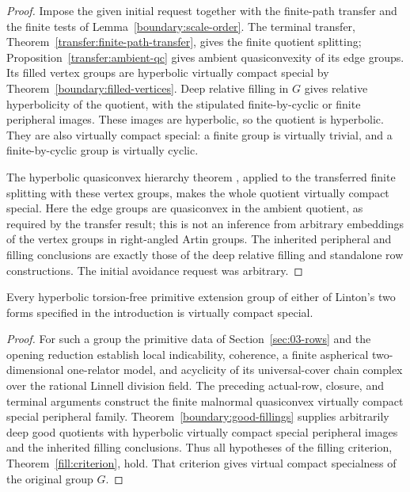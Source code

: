 \begin{proof}
Impose the given initial request together with the finite-path transfer
and the finite tests of Lemma~\ref{boundary:scale-order}. The terminal
transfer, Theorem~\ref{transfer:finite-path-transfer}, gives the finite
quotient splitting; Proposition~\ref{transfer:ambient-qc} gives ambient quasiconvexity
of its edge groups. Its filled vertex groups are hyperbolic virtually compact
special by Theorem~\ref{boundary:filled-vertices}. Deep relative filling
in $G$ gives relative hyperbolicity of the quotient, with the stipulated
finite-by-cyclic or finite peripheral images. These images are hyperbolic,
so the quotient is hyperbolic. They are also virtually compact special:
a finite group is virtually trivial, and a finite-by-cyclic group is
virtually cyclic.

The hyperbolic quasiconvex hierarchy theorem \cite{Wise2021}, applied to
the transferred finite splitting with these vertex groups, makes the
whole quotient virtually compact special. Here the edge groups are
quasiconvex in the ambient quotient, as required by the transfer result;
this is not an inference from arbitrary embeddings of the vertex groups
in right-angled Artin groups. The inherited peripheral and filling
conclusions are exactly those of the deep relative filling and standalone
row constructions. The initial avoidance request was arbitrary.
\end{proof}

\begin{theorem}\label{boundary:primitive-vcs}
Every hyperbolic torsion-free primitive extension group of either of
Linton's two forms specified in the introduction is virtually compact
special.
\end{theorem}

\begin{proof}
For such a group the primitive data of Section~\ref{sec:03-rows} and the
opening reduction establish local indicability,
coherence, a finite aspherical two-dimensional one-relator model, and
acyclicity of its universal-cover chain complex over the rational Linnell
division field. The preceding actual-row, closure, and terminal arguments
construct the finite malnormal quasiconvex virtually compact special
peripheral family. Theorem~\ref{boundary:good-fillings} supplies arbitrarily
deep good quotients with hyperbolic virtually compact special peripheral
images and the inherited filling conclusions. Thus all hypotheses of the
filling criterion, Theorem~\ref{fill:criterion}, hold. That criterion gives
virtual compact specialness of the original group $G$.
\end{proof}
